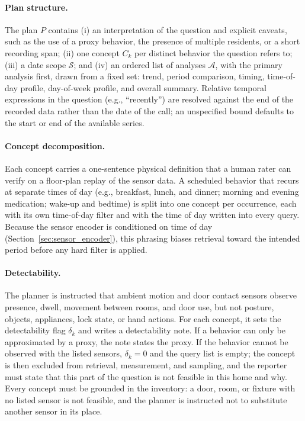 \paragraph{Plan structure.}
The plan $P$ contains (i) an interpretation of the question and explicit caveats, such as the use of a proxy behavior, the presence of multiple residents, or a short recording span; (ii) one concept $C_k$ per distinct behavior the question refers to; (iii) a date scope $\mathcal{S}$; and (iv) an ordered list of analyses $\mathcal{A}$, with the primary analysis first, drawn from a fixed set: trend, period comparison, timing, time-of-day profile, day-of-week profile, and overall summary. Relative temporal expressions in the question (e.g., ``recently'') are resolved against the end of the recorded data rather than the date of the call; an unspecified bound defaults to the start or end of the available series.

\paragraph{Concept decomposition.}
Each concept carries a one-sentence physical definition that a human rater can verify on a floor-plan replay of the sensor data. A scheduled behavior that recurs at separate times of day (e.g., breakfast, lunch, and dinner; morning and evening medication; wake-up and bedtime) is split into one concept per occurrence, each with its own time-of-day filter and with the time of day written into every query. Because the sensor encoder is conditioned on time of day (Section~\ref{sec:sensor_encoder}), this phrasing biases retrieval toward the intended period before any hard filter is applied.

\paragraph{Detectability.}
The planner is instructed that ambient motion and door contact sensors observe presence, dwell, movement between rooms, and door use, but not posture, objects, appliances, lock state, or hand actions. For each concept, it sets the detectability flag $\delta_k$ and writes a detectability note. If a behavior can only be approximated by a proxy, the note states the proxy. If the behavior cannot be observed with the listed sensors, $\delta_k = 0$ and the query list is empty; the concept is then excluded from retrieval, measurement, and sampling, and the reporter must state that this part of the question is not feasible in this home and why. Every concept must be grounded in the inventory: a door, room, or fixture with no listed sensor is not feasible, and the planner is instructed not to substitute another sensor in its place.

